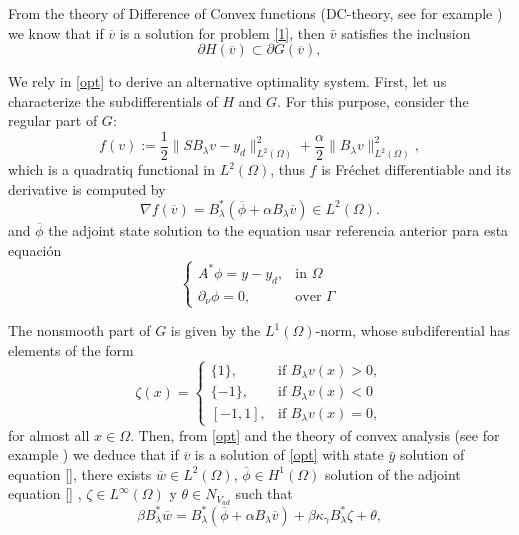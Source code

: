 \documentclass[11pt,a4paper]{amsart}
\newcommand{\om}{\Omega}
\newcommand{\norm}[1]{\lVert #1 \rVert}
\begin{document}
From the theory of Difference of Convex functions (DC-theory, see for example \cite{dihn, merino})  we know that if $\overline{v}$ is a solution for problem \eqref{1}, then $\bar v$ satisfies the inclusion 
\begin{equation}\label{opt}
    \partial H(\overline{v})\subset\partial G(\overline{v}),
\end{equation}

We rely in \eqref{opt} to derive an alternative optimality system. First, let us characterize the subdifferentials of $H$ and $G$. For this purpose, consider the regular part of $G$:
\[
	f(v):=\frac{1}{2}\norm{S	B_{\lambda}v-y_d}_{L^2(\om)}^2+\frac{\alpha}{2}\norm{	B_{\lambda}v}_{L^2(\om)}^2,
\]
 which is a quadratiq functional in $L^2(\om)$, thus $f$ is Fréchet differentiable and its derivative is computed by
\[\nabla f(\overline{v})=B_{\lambda}^*(\overline{\phi}+\alpha B_{\lambda}\overline{v}) \in L^2(\om).
\]
and $\overline{\phi}$ the adjoint state solution to the equation {\color{red} usar referencia anterior para esta equación}
\[
\begin{cases}
A^*\phi=y-y_{d}, &\mbox{in }\om\\
\partial_{\nu}\phi=0,&\mbox{over }\Gamma
\end{cases}
\]

The nonsmooth part of $G$ is given by the $L^1(\om)$-norm, whose subdiferential has elements of the form
\begin{equation}\label{zeta}
	\zeta(x)=\begin{cases}
		\{1\}, & \mbox{if }  B_{\lambda}v(x)>0,\\
		\{-1\}, & \mbox{if } B_{\lambda}v(x)<0\\
		 [-1,1], &\mbox{if }  B_{\lambda}v(x)=0,
	\end{cases}
\end{equation}
for almost all $x\in \om$. Then, from \eqref{opt} and the theory of convex analysis (see for example \cite{rock}) we deduce that if $\overline{v}$ is a solution of \eqref{opt} {\color{red}with state $\bar y$ solution of  equation \eqref{}}, there exists $\overline{w}\in L^2(\om)$, {\color{red} $\overline{\phi}\in H^1(\om)$ solution of the adjoint equation \eqref{} }, $\zeta\in L^{\infty}(\om)$ y $\theta \in N_{V_{ad}}$ such that     
     \begin{equation}\label{gradiente1}
         \beta B_{\lambda}^*\overline{w}=B_{\lambda}^*(\overline{\phi}+\alpha B_{\lambda}\overline{v})+\beta\kappa_{\gamma}B_{\lambda}^*\zeta+\theta,
     \end{equation}
\end{document}
